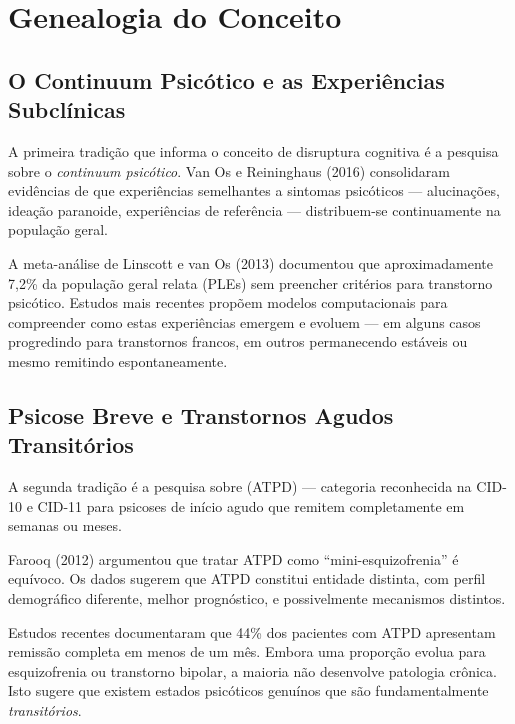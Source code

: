 \section{Genealogia do Conceito}
\label{sec:genealogia}

\subsection{O Continuum Psicótico e as Experiências Subclínicas}

A primeira tradição que informa o conceito de disruptura cognitiva é a pesquisa sobre o \textit{continuum psicótico}. Van Os e Reininghaus (2016) consolidaram evidências de que experiências semelhantes a sintomas psicóticos --- alucinações, ideação paranoide, experiências de referência --- distribuem-se continuamente na população geral.

A meta-análise de Linscott e van Os (2013) documentou que aproximadamente 7,2\% da população geral relata  (PLEs) sem preencher critérios para transtorno psicótico. Estudos mais recentes propõem modelos computacionais para compreender como estas experiências emergem e evoluem --- em alguns casos progredindo para transtornos francos, em outros permanecendo estáveis ou mesmo remitindo espontaneamente.

\subsection{Psicose Breve e Transtornos Agudos Transitórios}

A segunda tradição é a pesquisa sobre  (ATPD) --- categoria reconhecida na CID-10 e CID-11 para psicoses de início agudo que remitem completamente em semanas ou meses.

Farooq (2012) argumentou que tratar ATPD como \enquote{mini-esquizofrenia} é equívoco. Os dados sugerem que ATPD constitui entidade distinta, com perfil demográfico diferente, melhor prognóstico, e possivelmente mecanismos distintos.

Estudos recentes documentaram que 44\% dos pacientes com ATPD apresentam remissão completa em menos de um mês. Embora uma proporção evolua para esquizofrenia ou transtorno bipolar, a maioria não desenvolve patologia crônica. Isto sugere que existem estados psicóticos genuínos que são fundamentalmente \textit{transitórios}.

